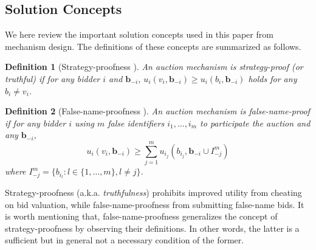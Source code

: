 \documentclass{sig-alternate}
\newtheorem{definition}{Definition}
\begin{document}
\subsection{Solution Concepts}
We here review the important solution concepts used in this paper from mechanism design. The definitions of these concepts are summarized as follows.
\begin{definition}[Strategy-proofness \cite{MIT:book,Oxford:book}]
\label{def_spm}
An auction mechanism is strategy-proof (or truthful) if for any bidder $i$ and $\mathbf{b}_{-i}$,
$u_i(v_i,\mathbf{b}_{-i}) \ge u_i(b_i,\mathbf{b}_{-i})$ holds for any $b_i \neq v_i$.
\end{definition}

\begin{definition}[False-name-proofness \cite{Yokoo:ICDCS:00, Todo:09:AAMAS}]
\label{def_fnp}
An auction mechanism is false-name-proof if for any bidder $i$ using $m$ false identifiers $i_1,\ldots,i_m$ to participate the auction and any $\mathbf{b}_{-i}$,
\begin{equation*}
  u_i(v_i, \mathbf{b}_{-i}) \ge \sum_{j=1}^m u_{i_j}(b_{i_j},\mathbf{b}_{-i}\cup I_{-j}^m)
\end{equation*}
where $I_{-j}^m=\{b_{i_l}:l\in \{1,\ldots,m\}, l\neq j\}$.
\end{definition}

Strategy-proofness (a.k.a. \emph{truthfulness}) prohibits improved utility from cheating on bid valuation, while false-name-proofness from submitting false-name bids. It is worth mentioning that, false-name-proofness generalizes the concept of strategy-proofness by observing their definitions. In other words, the latter is a sufficient but in general not a necessary condition of the former.



\end{document}
